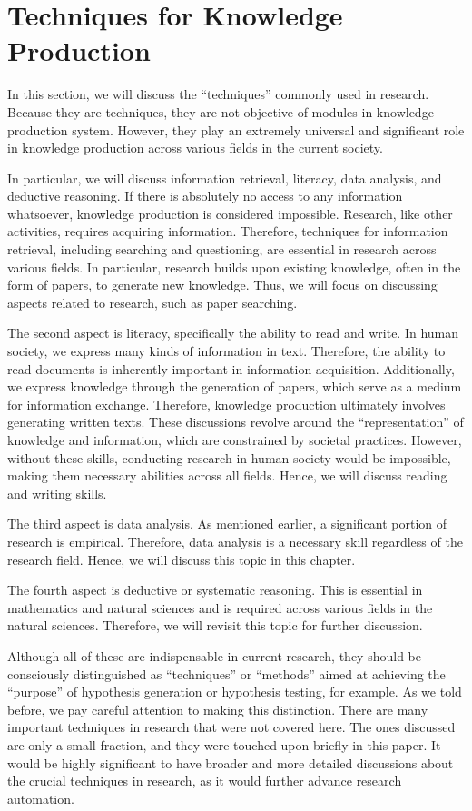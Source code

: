 \documentclass{book}
\begin{document}
\section{Techniques for Knowledge Production}
In this section, we will discuss the ``techniques'' commonly used in research. Because they are techniques, they are not objective of modules in knowledge production system. However, they play an extremely universal and significant role in knowledge production across various fields in the current society. 

In particular, we will discuss information retrieval, literacy, data analysis, and deductive reasoning. If there is absolutely no access to any information whatsoever, knowledge production is considered impossible. Research, like other activities, requires acquiring information. Therefore, techniques for information retrieval, including searching and questioning, are essential in research across various fields. In particular, research builds upon existing knowledge, often in the form of papers, to generate new knowledge. Thus, we will focus on discussing aspects related to research, such as paper searching. 

The second aspect is literacy, specifically the ability to read and write. In human society, we express many kinds of information in text. Therefore, the ability to read documents is inherently important in information acquisition. Additionally, we express knowledge through the generation of papers, which serve as a medium for information exchange. Therefore, knowledge production ultimately involves generating written texts. These discussions revolve around the ``representation'' of knowledge and information, which are constrained by societal practices. However, without these skills, conducting research in human society would be impossible, making them necessary abilities across all fields. Hence, we will discuss reading and writing skills. 

The third aspect is data analysis. As mentioned earlier, a significant portion of research is empirical. Therefore, data analysis is a necessary skill regardless of the research field. Hence, we will discuss this topic in this chapter. 

The fourth aspect is deductive or systematic reasoning. This is essential in mathematics and natural sciences and is required across various fields in the natural sciences. Therefore, we will revisit this topic for further discussion. 

Although all of these are indispensable in current research, they should be consciously distinguished as ``techniques'' or ``methods'' aimed at achieving the ``purpose'' of hypothesis generation or hypothesis testing, for example. As we told before, we pay careful attention to making this distinction. There are many important techniques in research that were not covered here. The ones discussed are only a small fraction, and they were touched upon briefly in this paper. It would be highly significant to have broader and more detailed discussions about the crucial techniques in research, as it would further advance research automation.
\end{document}
